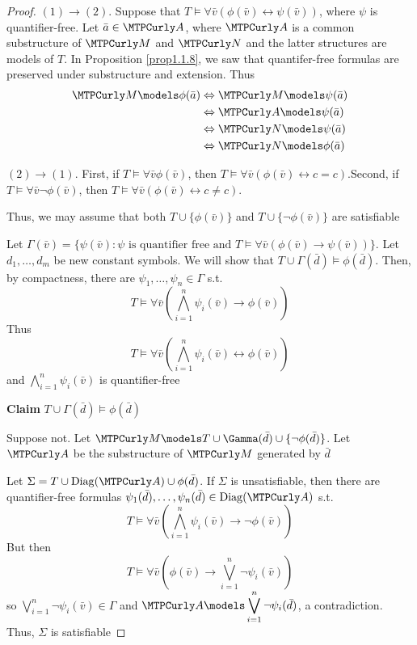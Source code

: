 \documentclass[11pt]{article}
\begin{document}
\begin{proof}
\((1)\to(2)\). Suppose that \(T\models\forall\bar{v}(\phi(\bar{v})\leftrightarrow\psi(\bar{v}))\),
where \(\psi\) is quantifier-free. Let \(\bar{a}\in\cala\), where \(\cala\) is a
common substructure of \(\calm\) and \(\caln\) and the latter structures are
models of \(T\). In Proposition \ref{prop1.1.8}, we saw that quantifer-free
formulas are preserved under substructure and extension. Thus
\begin{align*}
\calm\models\phi(\bar{a})&\Leftrightarrow\calm\models\psi(\bar{a})\\
&\Leftrightarrow\cala\models\psi(\bar{a})\\
&\Leftrightarrow\caln\models\psi(\bar{a})\\
&\Leftrightarrow\caln\models\phi(\bar{a})
\end{align*}

\((2)\to(1)\). First, if \(T\models\forall\bar{v}\phi(\bar{v})\), then
\(T\models\forall\bar{v}(\phi(\bar{v})\leftrightarrow c=c)\).Second, if
\(T\models\forall\bar{v}\neg\phi(\bar{v})\), then
\(T\models\forall\bar{v}(\phi(\bar{v})\leftrightarrow c\neq c)\).

Thus, we may assume that both \(T\cup\{\phi(\bar{v})\}\) and \(T\cup\{\neg\phi(\bar{v})\}\)
are satisfiable

Let \(\Gamma(\bar{v})=\{\psi(\bar{v}):\psi\text{ is quantifier free and
   }T\models\forall\bar{v}(\phi(\bar{v})\to\psi(\bar{v}))\}\). Let
\(d_1,\dots,d_m\) be new constant symbols. We will show that
\(T\cup\Gamma(\bar{d})\models\phi(\bar{d})\). Then, by compactness, there are
\(\psi_1,\dots,\psi_n\in\Gamma\) s.t.
\begin{equation*}
T\models\forall\bar{v}\left(\displaystyle\bigwedge_{i=1}^n\psi_i(\bar{v})\to\phi(\bar{v})
\right)
\end{equation*}
Thus
\begin{equation*}
T\models\forall\bar{v}\left(\displaystyle\bigwedge_{i=1}^n\psi_i(\bar{v})\leftrightarrow
\phi(\bar{v})
\right)
\end{equation*}
and \(\displaystyle\bigwedge_{i=1}^n\psi_i(\bar{v})\) is quantifier-free

\textbf{Claim} \(T\cup\Gamma(\bar{d})\models\phi(\bar{d})\)

Suppose not. Let \(\calm\models T\cup\Gamma(\bar{d})\cup\{\neg\phi(\bar{d})\}\). Let \(\cala\)
be the substructure of \(\calm\) generated by \(\bar{d}\)

Let \(\Sigma=T\cup\Diag(\cala)\cup\phi(\bar{d})\). If \(\Sigma\) is unsatisfiable, then there are
quantifier-free formulas \(\psi_1(\bar{d}),\dots,\psi_n(\bar{d})\in\Diag(\cala)\) s.t.
\begin{equation*}
T\models\forall\bar{v}\left(
\displaystyle\bigwedge_{i=1}^n\psi_i(\bar{v})\to\neg\phi(\bar{v})
\right)
\end{equation*}
But then
\begin{equation*}
T\models\forall\bar{v}\left(\phi(\bar{v})\to
\displaystyle\bigvee_{i=1}^n\neg\psi_i(\bar{v})
\right)
\end{equation*}
so \(\displaystyle\bigvee_{i=1}^n\neg\psi_i(\bar{v})\in\Gamma\) and
\(\cala\models\displaystyle\bigvee_{i=1}^n\neg\psi_i(\bar{d})\), a
contradiction. Thus, \(\Sigma\) is satisfiable


\end{proof}
\end{document}
